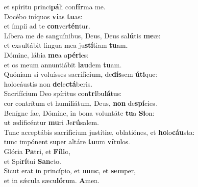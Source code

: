 \oddverse et spíritu princi\textbf{pá}li con\textbf{fír}ma me.\\
\evenverse Docébo iníquos \textbf{vi}as \textbf{tu}as:~\*\\
\evenverse et ímpii ad te \textbf{con}ver\textbf{tén}tur.\\
\oddverse Líbera me de sanguínibus, Deus, Deus sa\textbf{lú}tis \textbf{me}æ:~\*\\
\oddverse et exsultábit lingua mea ju\textbf{stí}tiam \textbf{tu}am.\\
\evenverse Dómine, lábia \textbf{me}a a\textbf{pé}\textbf{ri}es:~\*\\
\evenverse et os meum annuntiábit \textbf{lau}dem \textbf{tu}am.\\
\oddverse Quóniam si voluísses sacrifícium, de\textbf{dís}sem \textbf{ú}\textbf{ti}que:~\*\\
\oddverse holocáustis non \textbf{de}le\textbf{ctá}beris.\\
\evenverse Sacrifícium Deo spíritus con\textbf{tri}bu\textbf{lá}tus:~\*\\
\evenverse cor contrítum et humiliátum, Deus, \textbf{non} de\textbf{spí}cies.\\
\oddverse Benígne fac, Dómine, in bona voluntáte \textbf{tu}a \textbf{Si}on:~\*\\
\oddverse ut ædificéntur \textbf{mu}ri Je\textbf{rú}salem.\\
\evenverse Tunc acceptábis sacrifícium justítiæ, oblatiónes, et \textbf{ho}lo\textbf{cáu}sta:~\*\\
\evenverse tunc impónent super altáre \textbf{tu}um \textbf{ví}tulos.\\
\oddverse Glória \textbf{Pa}tri, et \textbf{Fí}\textbf{li}o,~\*\\
\oddverse et Spi\textbf{rí}tui \textbf{San}cto.\\
\evenverse Sicut erat in princípio, et \textbf{nunc}, et \textbf{sem}per,~\*\\
\evenverse et in sǽcula sæcu\textbf{ló}rum. \textbf{A}men.\\
